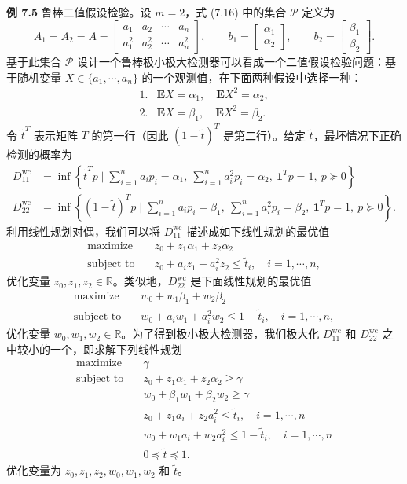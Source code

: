 \documentclass[UTF8,12pt,a4paper,fontset=fandol]{ctexart}
\begin{document}
\noindent\textbf{例 7.5}\quad
鲁棒二值假设检验。设 $m=2$，式 (7.16) 中的集合 $\mathcal{P}$ 定义为
\[
A_1=A_2=A=
\begin{bmatrix}
a_1 & a_2 & \cdots & a_n\\
a_1^2 & a_2^2 & \cdots & a_n^2
\end{bmatrix},
\qquad
b_1=
\begin{bmatrix}
\alpha_1\\
\alpha_2
\end{bmatrix},
\qquad
b_2=
\begin{bmatrix}
\beta_1\\
\beta_2
\end{bmatrix}.
\]
基于此集合 $\mathcal{P}$ 设计一个鲁棒极小极大检测器可以看成一个二值假设检验问题：基于随机变量 $X\in\{a_1,\cdots,a_n\}$ 的一个观测值，在下面两种假设中选择一种：
\[
\begin{array}{ll}
1. & \mathbf{E}X=\alpha_1,\quad \mathbf{E}X^2=\alpha_2,\\
2. & \mathbf{E}X=\beta_1,\quad \mathbf{E}X^2=\beta_2.
\end{array}
\]
令 $\tilde{t}^T$ 表示矩阵 $T$ 的第一行（因此 $(1-\tilde{t})^T$ 是第二行）。给定 $\tilde{t}$，最坏情况下正确检测的概率为
\[
\begin{aligned}
D_{11}^{\mathrm{wc}}&=\inf\left\{\tilde{t}^Tp\mid \sum_{i=1}^n a_ip_i=\alpha_1,\ \sum_{i=1}^n a_i^2p_i=\alpha_2,\ \mathbf{1}^Tp=1,\ p\succeq 0\right\}\\
D_{22}^{\mathrm{wc}}&=\inf\left\{(1-\tilde{t})^Tp\mid \sum_{i=1}^n a_ip_i=\beta_1,\ \sum_{i=1}^n a_i^2p_i=\beta_2,\ \mathbf{1}^Tp=1,\ p\succeq 0\right\}.
\end{aligned}
\]
利用线性规划对偶，我们可以将 $D_{11}^{\mathrm{wc}}$ 描述成如下线性规划的最优值
\[
\begin{aligned}
\text{maximize}\quad & z_0+z_1\alpha_1+z_2\alpha_2\\
\text{subject to}\quad & z_0+a_iz_1+a_i^2z_2\leq \tilde{t}_i,\quad i=1,\cdots,n,
\end{aligned}
\]
优化变量 $z_0,z_1,z_2\in\mathbb{R}$。类似地，$D_{22}^{\mathrm{wc}}$ 是下面线性规划的最优值
\[
\begin{aligned}
\text{maximize}\quad & w_0+w_1\beta_1+w_2\beta_2\\
\text{subject to}\quad & w_0+a_iw_1+a_i^2w_2\leq 1-\tilde{t}_i,\quad i=1,\cdots,n,
\end{aligned}
\]
优化变量 $w_0,w_1,w_2\in\mathbb{R}$。为了得到极小极大检测器，我们极大化 $D_{11}^{\mathrm{wc}}$ 和 $D_{22}^{\mathrm{wc}}$ 之中较小的一个，即求解下列线性规划
\[
\begin{aligned}
\text{maximize}\quad & \gamma\\
\text{subject to}\quad & z_0+z_1\alpha_1+z_2\alpha_2\geq \gamma\\
& w_0+\beta_1w_1+\beta_2w_2\geq \gamma\\
& z_0+z_1a_i+z_2a_i^2\leq \tilde{t}_i,\quad i=1,\cdots,n\\
& w_0+w_1a_i+w_2a_i^2\leq 1-\tilde{t}_i,\quad i=1,\cdots,n\\
& 0\preceq \tilde{t}\preceq 1.
\end{aligned}
\]
优化变量为 $z_0,z_1,z_2,w_0,w_1,w_2$ 和 $\tilde{t}$。
\end{document}
